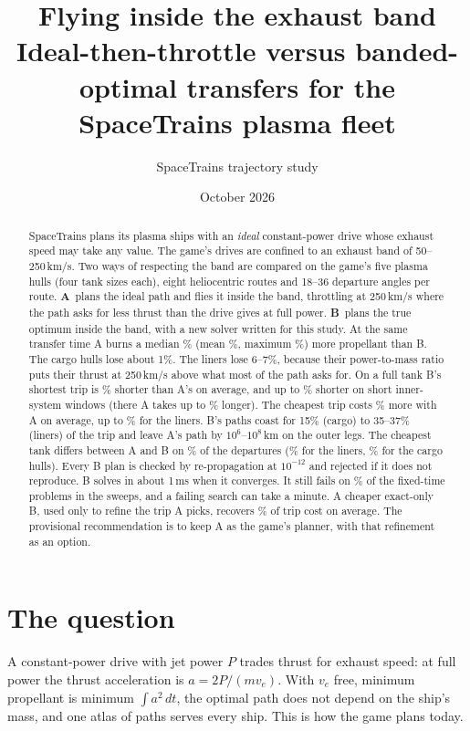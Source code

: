 \documentclass[10pt,a4paper]{article}
\title{Flying inside the exhaust band\\[2pt]\large Ideal-then-throttle versus banded-optimal transfers for the SpaceTrains plasma fleet}
\author{SpaceTrains trajectory study}
\date{October 2026}
\begin{document}
\maketitle

\begin{abstract}
SpaceTrains plans its plasma ships with an \emph{ideal} constant-power drive whose exhaust speed may take any value.
The game's drives are confined to an exhaust band of 50--250\,km/s. Two ways of respecting the band are compared on
the game's five plasma hulls (four tank sizes each), eight heliocentric routes and 18--36 departure angles per route. \textbf{A}~plans the
ideal path and flies it inside the band, throttling at 250\,km/s where the path asks for less thrust than the drive
gives at full power. \textbf{B}~plans the true optimum inside the band, with a new solver written for this study.
At the same transfer time A burns a median \sameMedian\% (mean \sameMean\%, maximum \sameMax\%) more propellant than B.
The cargo hulls lose about 1\%. The liners lose 6--7\%, because their power-to-mass ratio puts their thrust at
250\,km/s above what most of the path asks for. On a full tank B's shortest trip is \timeSaveMean\% shorter than A's
on average, and up to \timeSaveMax\% shorter on short inner-system windows (there A takes up to \timeMax\% longer).
The cheapest trip costs \econMean\% more with A on average, up to \econMax\%
for the liners. B's paths coast for 15\% (cargo) to 35--37\% (liners) of the trip and leave A's path by
$10^6$--$10^8$\,km on the outer legs. The cheapest tank differs between A and B on \tankDiffPct\% of the departures
(\tankDiffLinerPct\% for the liners, \tankDiffCargoPct\% for the cargo hulls). Every B plan is checked by
re-propagation at $10^{-12}$ and rejected if it does not reproduce. B solves in about
1\,ms when it converges. It still fails on \bFailPct\% of the fixed-time problems in the sweeps, and a failing search can
take a minute. A cheaper exact-only B, used only to refine the trip A picks, recovers \polCostMean\% of trip cost on
average. The provisional recommendation is to keep A as the game's planner, with that refinement as an option.
\end{abstract}

\section{The question}

A constant-power drive with jet power $P$ trades thrust for exhaust speed: at full power the thrust acceleration is
$a = 2P/(m v_e)$. With $v_e$ free, minimum propellant is minimum $\int a^2\,dt$, the optimal path does not depend
on the ship's mass, and one atlas of paths serves every ship. This is how the game plans today.
\end{document}
